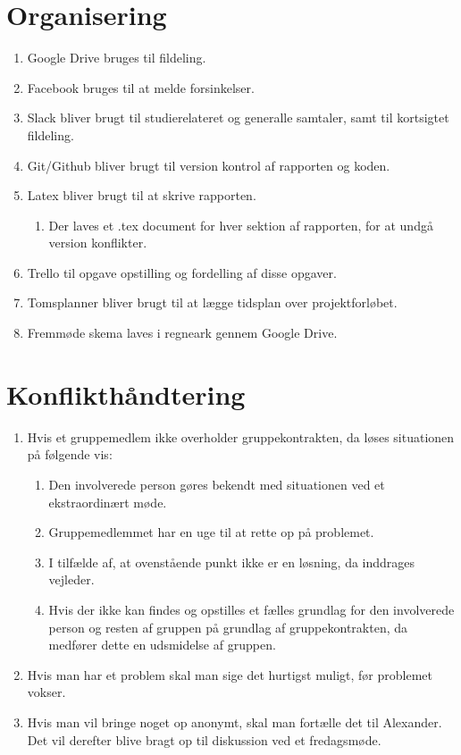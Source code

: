 \begin{enumerate}
\section{Organisering}
\begin{enumerate}
\item Google Drive bruges til fildeling.
\item Facebook bruges til at melde forsinkelser.
\item Slack bliver brugt til studierelateret og generalle samtaler, samt til kortsigtet fildeling.
\item Git/Github bliver brugt til version kontrol af rapporten og koden.
\item Latex bliver brugt til at skrive rapporten.
\begin{enumerate}
\item Der laves et .tex document for hver sektion af rapporten, for at undgå version konflikter.
\end{enumerate}
\item Trello til opgave opstilling og fordelling af disse opgaver.
\item Tomsplanner bliver brugt til at lægge tidsplan over projektforløbet.
\item Fremmøde skema laves i regneark gennem Google Drive.
\end{enumerate}

\section{Konflikthåndtering}
\begin{enumerate}
\item Hvis et gruppemedlem ikke overholder gruppekontrakten, da løses situationen på følgende vis:
\begin{enumerate}
\item Den involverede person gøres bekendt med situationen ved et ekstraordinært møde.
\item Gruppemedlemmet har en uge til at rette op på problemet.
\item I tilfælde af, at ovenstående punkt ikke er en løsning, da inddrages vejleder.
\item Hvis der ikke kan findes og opstilles et fælles grundlag for den involverede person og resten af gruppen på grundlag af gruppekontrakten, da medfører dette en udsmidelse af gruppen.
\end{enumerate}
\item Hvis man har et problem skal man sige det hurtigst muligt, før problemet vokser.
\item Hvis man vil bringe noget op anonymt, skal man fortælle det til Alexander. Det vil derefter blive bragt op til diskussion ved et fredagsmøde.
\end{enumerate}


\end{enumerate}
